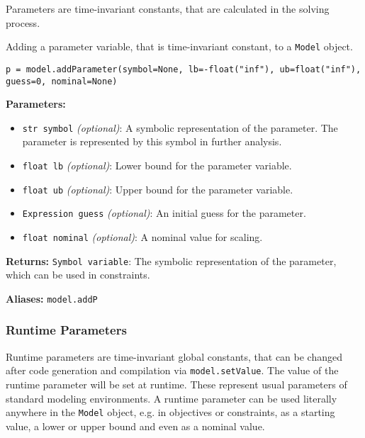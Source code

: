 \documentclass[12pt]{article}
\begin{document}
Parameters are time-invariant constants, that are calculated in the
solving process.

\begin{mdframed}[backgroundcolor=gray!10, roundcorner=10pt,
		linewidth=1pt]

	Adding a parameter variable, that is time-invariant constant,
	to a \texttt{Model} object.

	\begin{lstlisting}
p = model.addParameter(symbol=None, lb=-float("inf"), ub=float("inf"), guess=0, nominal=None)
		\end{lstlisting}
	\label{addParameter}
	\textbf{Parameters:}
	\begin{itemize}
		\item \texttt{str symbol} \emph{(optional)}: A symbolic
		      representation of the parameter. The parameter is
		      represented by this
		      symbol in further analysis.
		\item \texttt{float lb} \emph{(optional)}: Lower bound
		      for the parameter variable.
		\item \texttt{float ub} \emph{(optional)}: Upper bound
		      for the parameter variable.
		\item \texttt{Expression guess} \emph{(optional)}: An
		      initial guess for the parameter.
		\item \texttt{float nominal} \emph{(optional)}: A
		      nominal value for scaling.
	\end{itemize}

	\textbf{Returns:}
	\texttt{Symbol variable}: The symbolic representation of the
	parameter, which can be used in constraints.

	\textbf{Aliases:} \texttt{model.addP}
\end{mdframed}

\subsubsection{Runtime Parameters}
\label{c:runtimeParameters}
Runtime parameters are time-invariant global constants, that can be
changed after code generation and compilation via \texttt{model.setValue}. The
value of the
runtime parameter will be set at runtime. These represent usual
parameters of standard modeling environments. A runtime parameter can be used
literally anywhere in the \texttt{Model} object, e.g. in objectives or
constraints, as a starting value, a lower or upper bound and even as a nominal
value.
\end{document}

